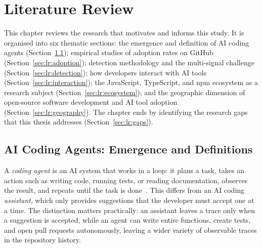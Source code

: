 
\chapter{Literature Review}
\label{chap:litrev}

This chapter reviews the research that motivates and informs this study. It
is organised into six thematic sections: the emergence and definition of AI
coding agents (Section~\ref{sec:lr:agents}); empirical studies of adoption
rates on GitHub (Section~\ref{sec:lr:adoption}); detection methodology and
the multi-signal challenge (Section~\ref{sec:lr:detection}); how developers
interact with AI tools (Section~\ref{sec:lr:interaction}); the JavaScript,
TypeScript, and npm ecosystem as a research subject
(Section~\ref{sec:lr:ecosystem}); and the geographic dimension of
open-source software development and AI tool adoption
(Section~\ref{sec:lr:geography}). The chapter ends by identifying the
research gaps that this thesis addresses (Section~\ref{sec:lr:gaps}).

\section{AI Coding Agents: Emergence and Definitions}
\label{sec:lr:agents}

A \emph{coding agent} is an AI system that works in a loop: it plans a task,
takes an action such as writing code, running tests, or reading documentation,
observes the result, and repeats until the task is done~\cite{robbesAgenticMuch2026}.
This differs from an AI coding \emph{assistant}, which only provides suggestions
that the developer must accept one at a time. The distinction matters practically:
an assistant leaves a trace only when a suggestion is accepted, while an agent can
write entire functions, create tests, and open pull requests autonomously, leaving
a wider variety of observable traces in the repository history.

